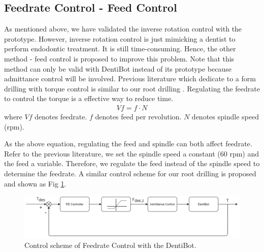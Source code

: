 \subsection{Feedrate Control - Feed Control}
\label{sec:Feed Control}
\hspace*{6mm}As mentioned above, we have validated the inverse rotation control with the prototype. However, inverse rotation control is just mimicking a dentist to perform endodontic treatment. It is still time-consuming. Hence, the other method - feed control is proposed to improve this problem. Note that this method can only be valid with DentiBot instead of its prototype because admittance control will be involved. Previous literature which dedicate to a form drilling with torque control is similar to our root drilling \cite{boessler2009effect}. Regulating the feedrate to control the torque is a effective way to reduce time. 
\begin{equation*}
\begin{split}
V\!f = f \cdot N
\end{split}
\end{equation*}
where $V\!f$ denotes feedrate. $f$ denotes feed per revolution. $N$ denotes spindle speed (rpm).
\par
As the above equation, regulating the feed and spindle can both affect feedrate. Refer to the previous literature, we set the spindle speed a constant ($60$ rpm) and the feed a variable. Therefore, we regulate the feed instead of the spindle speed to determine the feedrate. A similar control scheme for our root drilling is proposed and shown as Fig \ref{fig: feed_control}.
\begin{figure}[htbp]
\begin{center}
\includegraphics[width=1\linewidth]{Images/feedrate_control.png}
\caption{Control scheme of Feedrate Control with the DentiBot.}
\label{fig: feed_control}
\end{center}
\end{figure}
\par
